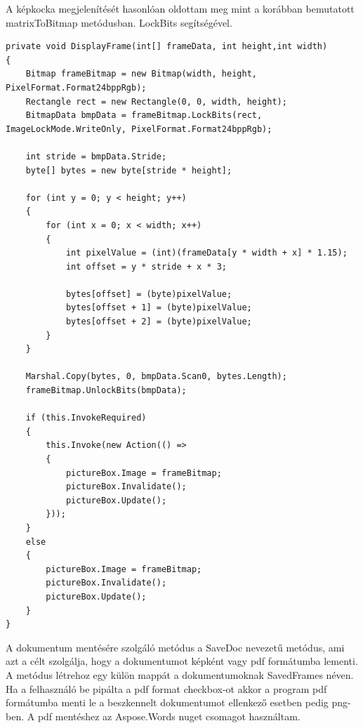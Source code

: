 \documentclass[]{thesis-ekf}
\theoremstyle{definition}
\theoremstyle{remark}
\begin{document}
A képkocka megjelenítését hasonlóan oldottam meg mint a korábban bemutatott matrixToBitmap metódusban. LockBits segítségével.
\begin{lstlisting}[language=CSharp]
private void DisplayFrame(int[] frameData, int height,int width)
{
	Bitmap frameBitmap = new Bitmap(width, height, PixelFormat.Format24bppRgb);
	Rectangle rect = new Rectangle(0, 0, width, height);
	BitmapData bmpData = frameBitmap.LockBits(rect, ImageLockMode.WriteOnly, PixelFormat.Format24bppRgb);
	
	int stride = bmpData.Stride;
	byte[] bytes = new byte[stride * height];
	
	for (int y = 0; y < height; y++)
	{
		for (int x = 0; x < width; x++)
		{
			int pixelValue = (int)(frameData[y * width + x] * 1.15);
			int offset = y * stride + x * 3;
			
			bytes[offset] = (byte)pixelValue;         
			bytes[offset + 1] = (byte)pixelValue;     
			bytes[offset + 2] = (byte)pixelValue;     
		}
	}
	
	Marshal.Copy(bytes, 0, bmpData.Scan0, bytes.Length);
	frameBitmap.UnlockBits(bmpData);
	
	if (this.InvokeRequired)
	{
		this.Invoke(new Action(() =>
		{
			pictureBox.Image = frameBitmap;
			pictureBox.Invalidate();
			pictureBox.Update();
		}));
	}
	else
	{
		pictureBox.Image = frameBitmap;
		pictureBox.Invalidate();
		pictureBox.Update();
	}
}	
\end{lstlisting}
A dokumentum mentésére szolgáló metódus a SaveDoc nevezetű metódus, ami azt a célt szolgálja, hogy a dokumentumot képként vagy pdf formátumba lementi. A metódus létrehoz egy külön mappát a dokumentumoknak SavedFrames néven. Ha a felhasználó be pipálta a pdf format checkbox-ot akkor a program pdf formátumba menti le a beszkennelt dokumentumot ellenkező esetben pedig png-ben. A pdf mentéshez az Aspose.Words\cite{aspose.word} nuget csomagot használtam.
\end{document}
